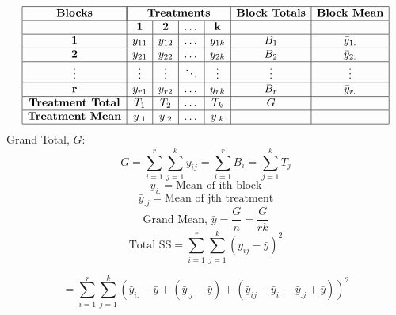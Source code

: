 \documentclass[oneside,12pt,fleqn]{book}
\begin{document}
\[
\begin{array}{|c|c|c|c|c|c|c|}
\hline
\textbf{Blocks} & \multicolumn{4}{|c|}{\textbf{Treatments}} & \textbf{Block Totals} & \textbf{Block Mean} \\ \hline
 & \textbf{1} & \textbf{2} & \dots & \textbf{k} & & \\ \hline
\textbf{1} & y_{11} & y_{12} & \dots & y_{1k} & B_1 & \bar{y}_{1.} \\ \hline
\textbf{2} & y_{21} & y_{22} & \dots & y_{2k} & B_2 & \bar{y}_{2.} \\ \hline
\vdots & \vdots & \vdots & \ddots & \vdots & \vdots & \vdots \\ \hline
\textbf{r} & y_{r1} & y_{r2} & \dots & y_{rk} & B_r & \bar{y}_{r.} \\ \hline
\textbf{Treatment Total} & T_1 & T_2 & \dots & T_k & G & \\ \hline
\textbf{Treatment Mean} & \bar{y}_{.1} & \bar{y}_{.2} & \dots & \bar{y}_{.k} & & \\ \hline
\end{array}
\]
Grand Total, \( G \):
\[
G = \sum_{i=1}^r \sum_{j=1}^k y_{ij} = \sum_{i=1}^r B_i = \sum_{j=1}^k T_j
\]
\[
\bar{y}_{i.} = \text{Mean of ith block}
\]
\[
\bar{y}_{.j} = \text{Mean of jth treatment}
\]
\[
\text{Grand Mean, } \bar{y} = \frac{G}{n} = \frac{G}{rk}
\]
\begin{equation}
\text{Total SS} = \sum_{i=1}^{r} \sum_{j=1}^{k} (y_{ij} - \bar{y})^2
\end{equation}


\begin{equation}
= \sum_{i=1}^{r} \sum_{j=1}^{k} (\bar{y}_{i.} - \bar{y} + (\bar{y}_{.j} - \bar{y}) + (\bar{y}_{ij} - \bar{y}_{i.} - \bar{y}_{.j} + \bar{y}))^2
\end{equation}
\end{document}
